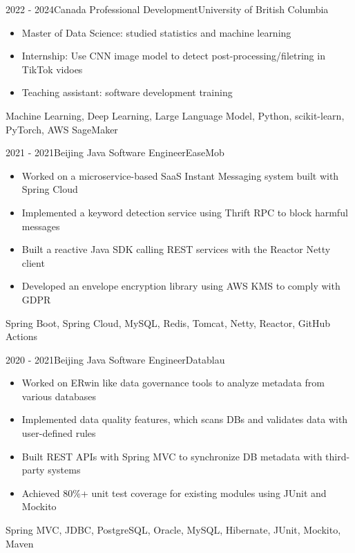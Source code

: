 \documentclass[localFont,alternative]{resume_template}
\begin{document}
    \begin{experiences}

    \experience
    {2022 - 2024}{Canada}
    {Professional Development}{University of British Columbia}
    {
        \begin{itemize}
        \item Master of Data Science: studied statistics and machine learning
        \item Internship: Use CNN image model to detect post-processing/filetring in TikTok vidoes
        \item Teaching assistant: software development training
        \end{itemize}
    }
    {Machine Learning, Deep Learning, Large Language Model, Python, scikit-learn, PyTorch, AWS SageMaker}

    \emptySeparator

    \experience
    {2021 - 2021}{Beijing}
    {Java Software Engineer}{EaseMob}
    {
        \begin{itemize}
        \item Worked on a microservice-based SaaS Instant Messaging system built with Spring Cloud
        \item Implemented a keyword detection service using Thrift RPC to block harmful messages
        \item Built a reactive Java SDK calling REST services with the Reactor Netty client
        \item Developed an envelope encryption library using AWS KMS to comply with GDPR
        \end{itemize}
    }
    {Spring Boot, Spring Cloud, MySQL, Redis, Tomcat, Netty, Reactor, GitHub Actions}

    \emptySeparator

    \experience
    {2020 - 2021}{Beijing}
    {Java Software Engineer}{Datablau}
    {
        \begin{itemize}
        \item Worked on ERwin like data governance tools to analyze metadata from various databases
        \item Implemented data quality features, which scans DBs and validates data with user-defined rules
        \item Built REST APIs with Spring MVC to synchronize DB metadata with third-party systems
        \item Achieved 80\%+ unit test coverage for existing modules using JUnit and Mockito
        \end{itemize}
    }
    {Spring MVC, JDBC, PostgreSQL, Oracle, MySQL, Hibernate, JUnit, Mockito, Maven}


\end{experiences}
\end{document}
